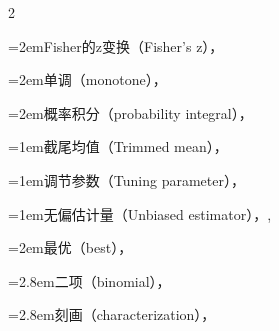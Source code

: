 \begin{multicols}{2}
\par\noindent\hangindent=2em\hspace*{1em}\label{idx:1039}Fisher的z变换（Fisher’s z），\hyperref[item:10.17.e]{\pageref*{item:10.17.e}}\par
\par\noindent\hangindent=2em\hspace*{1em}\label{idx:1040}单调（monotone），\hyperref[idxocc:1040:71]{\pageref*{idxocc:1040:71}}\par
\par\noindent\hangindent=2em\hspace*{1em}\label{idx:1041}概率积分（probability integral），\hyperref[ex:5.6.3]{\pageref*{ex:5.6.3}}\par
\par\addvspace{2pt}
\par\noindent\hangindent=1em\hspace*{0em}\label{idx:1042}截尾均值（Trimmed mean），\hyperref[idxocc:1042:442]{\pageref*{idxocc:1042:442}}\par
\par\addvspace{2pt}
\par\noindent\hangindent=1em\hspace*{0em}\label{idx:1043}调节参数（Tuning parameter），\hyperref[eq:10.2.2]{\pageref*{eq:10.2.2}}\par
\par\addvspace{2pt}
\par\noindent\hangindent=1em\hspace*{0em}\label{idx:1044}无偏估计量（Unbiased estimator），\hyperref[idxocc:1044:206]{\pageref*{idxocc:1044:206}}, \hyperref[def:7.3.2]{\pageref*{def:7.3.2}}\par
\par\noindent\hangindent=2em\hspace*{1em}\label{idx:1045}最优（best），\hyperref[def:7.3.7]{\pageref*{def:7.3.7}}\par
\par\noindent\hangindent=2.8em\hspace*{1.8em}\label{idx:1046}二项（binomial），\hyperref[ex:7.3.24]{\pageref*{ex:7.3.24}}\par
\par\noindent\hangindent=2.8em\hspace*{1.8em}\label{idx:1047}刻画（characterization），\hyperref[thm:7.3.20]{\pageref*{thm:7.3.20}}\par

\end{multicols}
